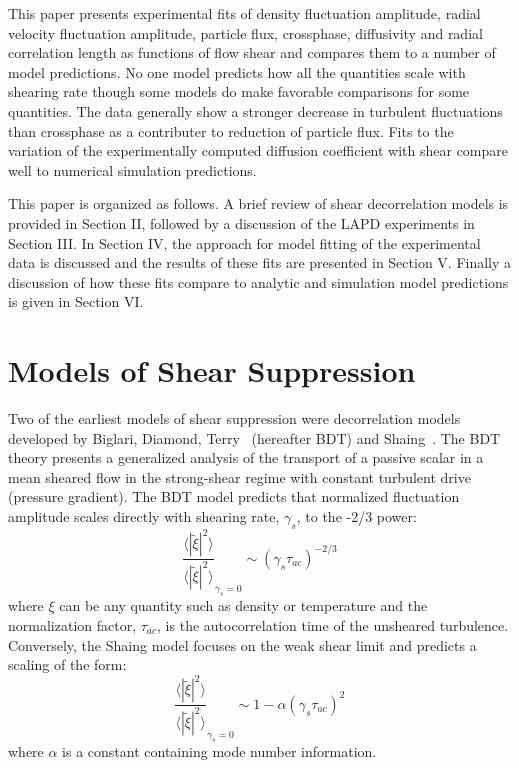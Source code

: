 \documentclass[aip,pop,amsmath,amssymb,preprint,superscriptaddress]{revtex4-1} %
\begin{document}
This paper presents experimental fits of density fluctuation
amplitude, radial velocity fluctuation amplitude, particle flux,
crossphase, diffusivity and radial correlation length as functions of
flow shear and compares them to a number of model predictions. No one
model predicts how all the quantities scale with shearing rate though
some models do make favorable comparisons for some quantities.  The
data generally show a stronger decrease in turbulent fluctuations than
crossphase as a contributer to reduction of particle flux.  Fits to
the variation of the experimentally computed diffusion coefficient
with shear compare well to numerical simulation predictions. 

This paper is organized as follows.  A brief review of shear decorrelation models is provided in Section II, followed by a discussion of the LAPD experiments in Section III. In Section IV, the approach for model fitting of the experimental data is discussed and the results of these fits are presented in Section V. Finally a discussion of how these fits compare to analytic and simulation model predictions is given in Section VI.

\section{Models of Shear Suppression}

Two of the earliest models of shear suppression were decorrelation models developed by Biglari, Diamond, Terry~\cite{biglari90} (hereafter BDT) and Shaing~\cite{shaing90}. The BDT theory presents a generalized analysis of the transport of a passive scalar in a mean sheared flow in the strong-shear regime with constant turbulent drive (pressure gradient). The BDT model predicts that normalized fluctuation amplitude scales directly with shearing rate, $\gamma_{s}$, to the -2/3 power:
%
\begin{equation}
\frac{\langle |\tilde{\xi}|^{2} \rangle}{\langle |\tilde{\xi}|^{2} \rangle}_{\gamma_{s}=0} \sim (\gamma_{s}\tau_{ac})^{-2/3}
\label{eq:BDT_theory}
\end{equation}
%
where $\xi$ can be any quantity such as density or temperature and the normalization factor, $\tau_{ac}$, is the autocorrelation time of the unsheared turbulence. Conversely, the Shaing model focuses on the weak shear limit and predicts a scaling of the form:
%
\begin{equation}
\frac{\langle |\tilde{\xi}|^{2} \rangle}{\langle |\tilde{\xi}|^{2} \rangle}_{\gamma_{s}=0} \sim 1- \alpha(\gamma_{s}\tau_{ac})^2
\label{eq:shaing_theory}
\end{equation}
%
where $\alpha$ is a constant containing mode number information. 
\end{document}
